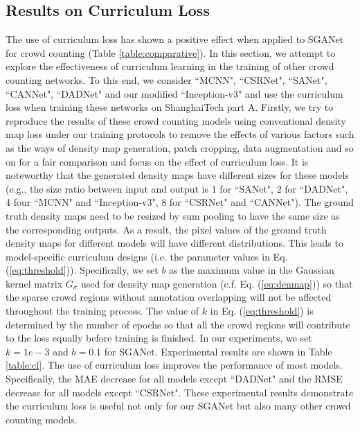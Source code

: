 \documentclass[journal,comsoc]{IEEEtran}
\begin{document}
\subsection{Results on Curriculum Loss}\label{sec:result_cl}
The use of curriculum loss has shown a positive effect when applied to SGANet for crowd counting (Table \ref{table:comparative}). In this section, we attempt to explore the effectiveness of curriculum learning in the training of other crowd counting networks. To this end, we consider ``MCNN", ``CSRNet", ``SANet", ``CANNet", ``DADNet" and our modified ``Inception-v3" and use the curriculum loss when training these networks on ShanghaiTech part A. Firstly, we try to reproduce the results of these crowd counting models using conventional density map loss under our training protocols to remove the effects of various factors such as the ways of density map generation, patch cropping, data augmentation and so on for a fair comparison and focus on the effect of curriculum loss. It is noteworthy that the generated density maps have different sizes for these models (e.g., the size ratio between input and output is 1 for ``SANet", 2 for ``DADNet", 4 four ``MCNN" and ``Inception-v3", 8 for ``CSRNet" and ``CANNet"). The ground truth density maps need to be resized by sum pooling to have the same size as the corresponding outputs. As a result, the pixel values of the ground truth density maps for different models will have different distributions. This leads to model-specific curriculum designs (i.e. the parameter values in Eq.(\ref{eq:threshold})). 
Specifically, we set $b$ as the maximum value in the Gaussian kernel matrix $G_{\sigma}$ used for density map generation (c.f. Eq. (\ref{eq:denmap})) so that the sparse crowd regions without annotation overlapping will not be affected throughout the training process. The value of $k$ in Eq. (\ref{eq:threshold}) is determined by the number of epochs so that all the crowd regions will contribute to the loss equally before training is finished. 
In our experiments, we set $k=1e-3$ and $b=0.1$ for SGANet. Experimental results are shown in Table \ref{table:cl}. The use of curriculum loss improves the performance of most models. Specifically, the MAE decrease for all models except ``DADNet" and the RMSE decrease for all models except ``CSRNet". These experimental results demonstrate the curriculum loss is useful not only for our SGANet but also many other crowd counting models.
\end{document}
